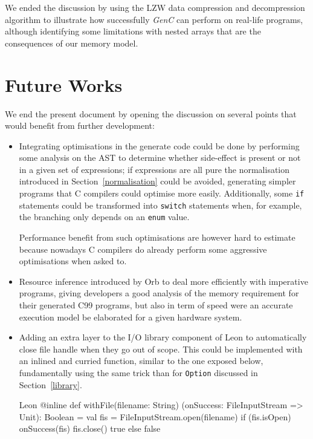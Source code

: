 \documentclass[a4paper,twoside]{article}
\newcommand{\InlineC}[1]{\lstinline[language=C99]|#1|}
\newcommand{\InlineS}[1]{\lstinline[language=Leon]|#1|}
\let\oldsection\section
\renewcommand\section{\cleardoublepage\oldsection}
\newcommand{\GenC}{\emph{GenC}\xspace}
\newcommand{\RefSec}[1]{Section~\ref{#1}}
\begin{document}
We ended the discussion by using the LZW data compression and decompression
algorithm to illustrate how successfully \GenC can perform on real-life
programs, although identifying some limitations with nested arrays that are the
consequences of our memory model.


\section{Future Works}
\label{future_works}

We end the present document by opening the discussion on several points that
would benefit from further development:

\renewcommand{\labelitemi}{$\diamond$}
\begin{itemize}

\item Integrating optimisations in the generate code could be done by performing
some analysis on the AST to determine whether side-effect is present or not in a
given set of expressions; if expressions are all pure the normalisation
introduced in \RefSec{normalisation} could be avoided, generating simpler
programs that C compilers could optimise more easily. Additionally, some
\InlineC{if} statements could be transformed into \InlineC{switch} statements
when, for example, the branching only depends on an \InlineC{enum} value.

Performance benefit from such optimisations are however hard to estimate because
nowadays C compilers do already perform some aggressive optimisations when asked
to.

\item Resource inference introduced by Orb \cite{Madhavan2014} to deal more
efficiently with imperative programs, giving developers a good analysis of the
memory requirement for their generated C99 programs, but also in term of speed
were an accurate execution model be elaborated for a given hardware system.

\item Adding an extra layer to the I/O library component of Leon to
automatically close file handle when they go out of scope. This could be
implemented with an inlined and curried function, similar to the one exposed
below, fundamentally using the same trick than for \InlineS{Option} discussed in
\RefSec{library}.

\begin{ShortCode}{Leon}
@inline
def withFile(filename: String)
            (onSuccess: FileInputStream => Unit): Boolean = {
  val fis = FileInputStream.open(filename)
  if (fis.isOpen) {
    onSuccess(fis)
    fis.close()
    true
  } else false
}
\end{ShortCode}


\end{itemize}
\end{document}
